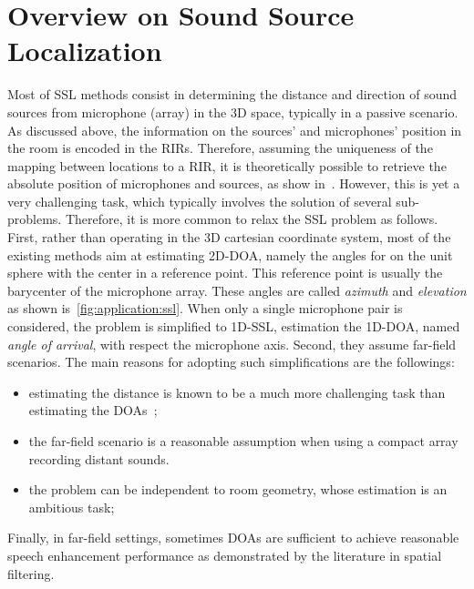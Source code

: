 \section{Overview on Sound Source Localization}\label{sec:application:localization}
Most of \acf{SSL} methods consist in determining the distance and direction of sound sources from microphone (array) in the 3D space, typically in a passive scenario.
As discussed above, the information on the sources' and microphones' position in the room is encoded in the \acp{RIR}.
Therefore, assuming the uniqueness of the mapping between locations to a \ac{RIR}, it is theoretically possible to retrieve the absolute position of microphones and sources, as show in~.
However,  this is yet a very challenging task, which typically involves the solution of several sub-problems.
Therefore, it is more common to relax the \ac{SSL} problem as follows.
First, rather than operating in the  3D cartesian coordinate system, most of the existing methods aim at estimating 2D-\acf{DOA}, namely the angles for on the unit sphere with the center in a reference point.
This reference point is usually the barycenter of the microphone array.
These angles are called \textit{azimuth} and \textit{elevation} as shown is~\cref{fig:application:ssl}.
When only a single microphone pair is considered, the problem is simplified to 1D-\ac{SSL}, estimation the 1D-\ac{DOA}, named \textit{angle of arrival}, with respect the microphone axis.
Second, they assume far-field scenarios.
The main reasons for adopting such simplifications are the followings:
\begin{itemize}
    \item estimating the distance is known to be a much more challenging task than estimating the \acp{DOA}~;
    \item the far-field scenario is a reasonable assumption when using a compact array recording distant sounds.
    \item the problem can be independent to room geometry, whose estimation is an ambitious task;
\end{itemize}
Finally, in far-field settings, sometimes \acp{DOA} are sufficient to achieve reasonable speech enhancement performance as demonstrated by the literature in spatial filtering.

